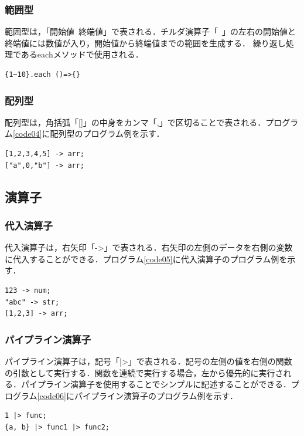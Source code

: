 \documentclass[10pt,a4j]{ltjsarticle}
\begin{document}
\subsubsection{範囲型}
範囲型は，「開始値~終端値」で表される．チルダ演算子「~」の左右の開始値と終端値には数値が入り，開始値から終端値までの範囲を生成する．
繰り返し処理であるeachメソッドで使用される．

\begin{lstlisting}[caption=範囲型のプログラム例, label=code03]
{1~10}.each ()=>{}
\end{lstlisting}

\subsubsection{配列型}
配列型は，角括弧「[]」の中身をカンマ「,」で区切ることで表される．プログラム\ref{code04}に配列型のプログラム例を示す．

\begin{lstlisting}[caption=範囲型のプログラム例, label=code04]
[1,2,3,4,5] -> arr;
["a",0,"b"] -> arr;
\end{lstlisting}

\subsection{演算子}
\subsubsection{代入演算子}
代入演算子は，右矢印「->」で表される．右矢印の左側のデータを右側の変数に代入することができる．プログラム\ref{code05}に代入演算子のプログラム例を示す．

\begin{lstlisting}[caption=代入演算子のプログラム例, label=code05]
123 -> num;
"abc" -> str;
[1,2,3] -> arr;
\end{lstlisting}

\subsubsection{パイプライン演算子}
パイプライン演算子は，記号「|>」で表される．記号の左側の値を右側の関数の引数として実行する．関数を連続で実行する場合，左から優先的に実行される．パイプライン演算子を使用することでシンプルに記述することができる．プログラム\ref{code06}にパイプライン演算子のプログラム例を示す．

\begin{lstlisting}[caption=パイプライン演算子のプログラム例, label=code06]
1 |> func;
{a, b} |> func1 |> func2;
\end{lstlisting}
\end{document}
